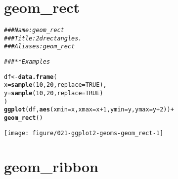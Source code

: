\documentclass[a4paper,titlepage]{tufte-handout}\usepackage[]{graphicx}\usepackage[]{color}
\makeatletter
\def\maxwidth{ %
  \ifdim\Gin@nat@width>\linewidth
    \linewidth
  \else
    \Gin@nat@width
  \fi
}
\newcommand{\hlnum}[1]{\textcolor[rgb]{0.686,0.059,0.569}{#1}}%
\newcommand{\hlcom}[1]{\textcolor[rgb]{0.678,0.584,0.686}{\textit{#1}}}%
\newcommand{\hlopt}[1]{\textcolor[rgb]{0,0,0}{#1}}%
\newcommand{\hlstd}[1]{\textcolor[rgb]{0.345,0.345,0.345}{#1}}%
\newcommand{\hlkwb}[1]{\textcolor[rgb]{0.69,0.353,0.396}{#1}}%
\newcommand{\hlkwc}[1]{\textcolor[rgb]{0.333,0.667,0.333}{#1}}%
\newcommand{\hlkwd}[1]{\textcolor[rgb]{0.737,0.353,0.396}{\textbf{#1}}}%
\newenvironment{kframe}{%
 \def\at@end@of@kframe{}%
 \ifinner\ifhmode%
  \def\at@end@of@kframe{\end{minipage}}%
  \begin{minipage}{\columnwidth}%
 \fi\fi%
 \def\FrameCommand##1{\hskip\@totalleftmargin \hskip-\fboxsep
 \colorbox{shadecolor}{##1}\hskip-\fboxsep
     \hskip-\linewidth \hskip-\@totalleftmargin \hskip\columnwidth}%
 \MakeFramed {\advance\hsize-\width
   \@totalleftmargin\z@ \linewidth\hsize
   \@setminipage}}%
 {\par\unskip\endMakeFramed%
 \at@end@of@kframe}
\newenvironment{knitrout}{}{} %
\makeatother
\begin{document}
\section{geom\_rect}

\begin{knitrout}
\color{fgcolor}\begin{kframe}
\begin{alltt}
\hlcom{### Name: geom_rect}
\hlcom{### Title: 2d rectangles.}
\hlcom{### Aliases: geom_rect}

\hlcom{### ** Examples}

\hlstd{df} \hlkwb{<-} \hlkwd{data.frame}\hlstd{(}
  \hlkwc{x} \hlstd{=} \hlkwd{sample}\hlstd{(}\hlnum{10}\hlstd{,} \hlnum{20}\hlstd{,} \hlkwc{replace} \hlstd{=} \hlnum{TRUE}\hlstd{),}
  \hlkwc{y} \hlstd{=} \hlkwd{sample}\hlstd{(}\hlnum{10}\hlstd{,} \hlnum{20}\hlstd{,} \hlkwc{replace} \hlstd{=} \hlnum{TRUE}\hlstd{)}
\hlstd{)}
\hlkwd{ggplot}\hlstd{(df,} \hlkwd{aes}\hlstd{(}\hlkwc{xmin} \hlstd{= x,} \hlkwc{xmax} \hlstd{= x} \hlopt{+} \hlnum{1}\hlstd{,} \hlkwc{ymin} \hlstd{= y,} \hlkwc{ymax} \hlstd{= y} \hlopt{+} \hlnum{2}\hlstd{))} \hlopt{+}
\hlkwd{geom_rect}\hlstd{()}
\end{alltt}
\end{kframe}
\texttt{[image: figure/021-ggplot2-geoms-geom\_rect-1]} 

\end{knitrout}


\section{geom\_ribbon}
\end{document}
